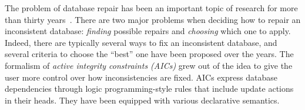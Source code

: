 \documentclass[runningheads]{llncs}
\begin{document}
The problem of database repair has been an important topic of research for more than thirty years~\cite{icdt/Abiteboul88}. 
There are two major problems when deciding how to repair an inconsistent database: \emph{finding} possible repairs and \emph{choosing} which one to apply.
Indeed, there are typically several ways to fix an inconsistent database, and several criteria to choose the ``best'' one have been proposed over the years.
% 
The formalism of \emph{active integrity constraints (AICs)} \cite{ppdp/FlescaGZ04} grew out of the idea to give the user more control over how inconsistencies are fixed. 
AICs express database dependencies through logic programming-style rules that include update actions in their heads.
They have been equipped with various declarative semantics.
\end{document}
